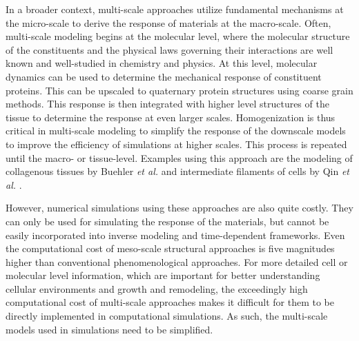     In a broader context, multi-scale approaches utilize fundamental mechanisms at the micro-scale to derive the response of materials at the macro-scale. Often, multi-scale modeling begins at the molecular level, where the molecular structure of the constituents and the physical laws governing their interactions are well known and well-studied in chemistry and physics. At this level, molecular dynamics can be used to determine the mechanical response of constituent proteins. This can be upscaled to quaternary protein structures using coarse grain methods. This response is then integrated with higher level structures of the tissue to determine the response at even larger scales. Homogenization is thus critical in multi-scale modeling to simplify the response of the downscale models to improve the efficiency of simulations at higher scales. This process is repeated until the macro- or tissue-level. Examples using this approach are the modeling of collagenous tissues by Buehler \textit{et al.} \cite{buehler_atomistic_2006, buehler_nanomechanics_2008} and intermediate filaments of cells by Qin \textit{et al.} \cite{qin_multi_2010}. 
    
    
    However, numerical simulations using these approaches are also quite costly. They can only be used for simulating the response of the materials, but cannot be easily incorporated into inverse modeling and time-dependent frameworks. Even the computational cost of meso-scale structural approaches is five magnitudes higher than conventional phenomenological approaches. For more detailed cell or molecular level information, which are important for better understanding cellular environments and growth and remodeling, the exceedingly high computational cost of multi-scale approaches makes it difficult for them to be directly implemented in computational simulations. As such, the multi-scale models used in simulations need to be simplified.

